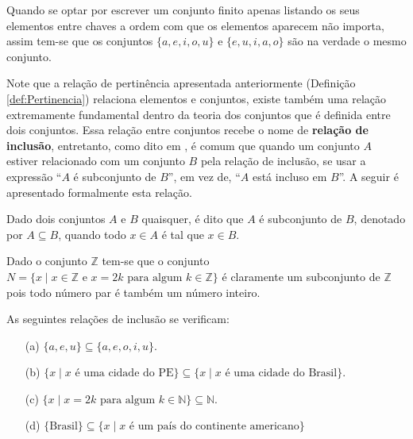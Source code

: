 \begin{rema}
	Quando se optar por escrever um conjunto finito apenas listando os seus elementos entre chaves a ordem com que os elementos aparecem não importa, assim tem-se que os conjuntos $\{a, e, i, o , u\}$ e $\{e, u, i, a, o\}$ são na verdade o mesmo conjunto.
\end{rema}

Note que a relação de pertinência  apresentada anteriormente (Definição \ref{def:Pertinencia}) relaciona elementos e conjuntos, existe também uma relação extremamente fundamental dentro da teoria dos conjuntos que é definida entre dois conjuntos. Essa relação entre conjuntos recebe o nome de \textbf{relação de inclusão}, entretanto, como dito em \cite{lipschutz1978-TC}, é comum que quando um conjunto $A$ estiver relacionado com um conjunto $B$ pela relação de inclusão, se usar a expressão ``$A$ é subconjunto de $B$'', em vez de, ``$A$ está incluso em $B$''. A seguir é apresentado formalmente esta relação.

\begin{definition}\label{def:RelacaoInclusao}
	Dado dois conjuntos $A$ e $B$ quaisquer, é dito que $A$ é subconjunto de $B$, denotado por $A \subseteq B$, quando todo $x \in A$ é tal que $x \in B$.
\end{definition}

\begin{exem}\label{exe:ConjuntoHerdeiro}
	Dado o conjunto $\mathbb{Z}$ tem-se que o conjunto $N = \{x \mid x \in \mathbb{Z} \mbox{ e } x = 2k \mbox{ para algum } k \in \mathbb{Z}\}$ é claramente um subconjunto de $\mathbb{Z}$ pois todo número par é também um número inteiro.
\end{exem}

\begin{exem}\label{exe:Inclusao}
	As seguintes relações de inclusão se verificam:
	\begin{itemize}
		\item[(a)] $\{a, e, u\} \subseteq \{a, e, o, i , u\}$.
		\item[(b)] $\{x \mid x \mbox{ é uma cidade do PE}\} \subseteq \{x \mid x \mbox{ é uma cidade do Brasil}\}$.
		\item[(c)] $\{x \mid x = 2k \mbox{ para algum } k \in \mathbb{N}\} \subseteq \mathbb{N}$.
		\item[(d)] $\{\mbox{Brasil}\} \subseteq \{x \mid x \mbox{ é um país do continente americano}\}$
	\end{itemize}
\end{exem}


